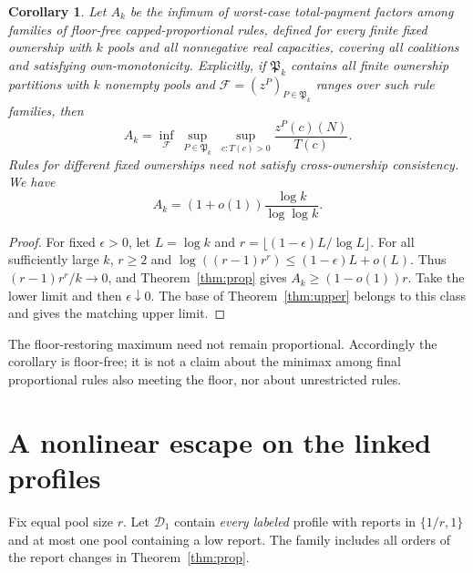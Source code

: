 \documentclass[11pt]{article}
\newtheorem{corollary}[theorem]{Corollary}
\theoremstyle{definition}\newtheorem{definition}[theorem]{Definition}
\theoremstyle{remark}\newtheorem{remark}[theorem]{Remark}
\begin{document}
\begin{corollary}\label{cor:minimax}
Let $A_k$ be the infimum of worst-case total-payment factors among families
of floor-free capped-proportional rules, defined for every finite fixed
ownership with $k$ pools and all nonnegative real capacities, covering all
coalitions and satisfying own-monotonicity. Explicitly, if $\mathfrak P_k$
contains all finite ownership partitions with $k$ nonempty pools and
$\mathcal F=(z^P)_{P\in\mathfrak P_k}$ ranges over such rule families, then
\[
 A_k=\inf_{\mathcal F}\ \sup_{P\in\mathfrak P_k}\ \sup_{c:T(c)>0}
 \frac{z^P(c)(N)}{T(c)}.
\]
Rules for different fixed ownerships need not satisfy cross-ownership
consistency. We have
\[
 A_k=(1+o(1))\frac{\log k}{\log\log k}.
\]
\end{corollary}
\begin{proof}
For fixed $\epsilon>0$, let $L=\log k$ and
$r=\lfloor(1-\epsilon)L/\log L\rfloor$. For all sufficiently large $k$,
$r\ge2$ and
$\log((r-1)r^r)\le(1-\epsilon)L+o(L)$.
Thus $(r-1)r^r/k\to0$, and Theorem~\ref{thm:prop} gives
$A_k\ge(1-o(1))r$. Take the lower limit and then $\epsilon\downarrow0$.
The base of Theorem~\ref{thm:upper} belongs to this class and gives the
matching upper limit.
\end{proof}
The floor-restoring maximum need not remain proportional. Accordingly the
corollary is floor-free; it is not a claim about the minimax among final
proportional rules also meeting the floor, nor about unrestricted rules.

\section{A nonlinear escape on the linked profiles}\label{sec:escape}
Fix equal pool size $r$. Let $\mathcal D_1$ contain \emph{every labeled}
profile with reports in $\{1/r,1\}$ and at most one pool containing a low
report. The family includes all orders of the report changes in
Theorem~\ref{thm:prop}.
\end{document}
